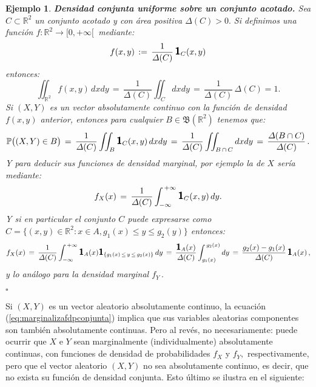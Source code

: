 \documentclass[spanish,10pt,letterpaper]{article}
\newtheorem{ejem}{Ejemplo}
\newcommand{\prob}{\mathbb{P}}
\newcommand{\Runo}{\mathbb{R}}
\newcommand{\indic}{\textbf{\textsf{\large{1}}}}
\newcommand{\qed}{\begin{flushright}$\square$\end{flushright}}
\begin{document}
\bigskip 

\begin{ejem}\label{ej:unifbiv}
    \textbf{Densidad conjunta uniforme sobre un conjunto acotado.} Sea $C\subset\Runo^2$ un conjunto acotado y con área positiva $\varDelta(C)>0.$ Si definimos una función $f:\Runo^2\rightarrow[0,+\infty[\,$ mediante:
    $$f(x,y) \,:=\, \frac{1}{\varDelta(C)}\,\indic_C(x,y)$$
    entonces:
    $$\iint_{\Runo^2}f(x,y)\,dxdy \,=\, \frac{1}{\varDelta(C)}\iint_C dxdy \,=\, \frac{1}{\varDelta(C)}\,\varDelta(C)=1.$$ Si $(X,Y)$ es un vector absolutamente continuo con la función de densidad $f(x,y)$ anterior, entonces para cualquier $B\in\mathfrak{B}(\Runo^2)$ tenemos que:
    $$\prob\big((X,Y)\in B\big) \,=\, \frac{1}{\varDelta(C)}\iint_B\indic_C(x,y)\,dxdy \,=\, \frac{1}{\varDelta(C)}\iint_{B\,\cap\,C}dxdy \,=\, \frac{\varDelta(B\cap C)}{\varDelta(C)}\,.$$
    Y para deducir sus funciones de densidad marginal, por ejemplo la de $X$ sería mediante:
    $$f_X(x) \,=\, \frac{1}{\varDelta(C)}\int_{-\infty}^{\,+\infty}\indic_C(x,y)\,dy.$$
    Y si en particular el conjunto $C$ puede expresarse como $C=\{(x,y)\in\Runo^2:x\in A, g_1(x) \leq y \leq g_2(y)\}$ entonces:
    $$f_X(x) \,=\, \frac{1}{\varDelta(C)}\int_{-\infty}^{\,+\infty}\indic_A(x)\indic_{\{g_1(x)\,\leq\,y\,\leq\,g_2(x)\}}\,dy \,=\, \frac{\indic_A(x)}{\varDelta(C)}\int_{g_1(x)}^{\,g_2(x)}dy \,=\, \frac{g_2(x)-g_1(x)}{\varDelta(C)}\,\indic_A(x)\,,$$
    y lo análogo para la densidad marginal $f_Y\,.$ \qed 
\end{ejem}

Si $(X,Y)$ es un vector aleatorio absolutamente continuo, la ecuación (\ref{eq:marginalizafdpconjunta}) implica que sus variables aleatorias componentes son también absolutamente continuas. Pero al revés, no necesariamente: puede ocurrir que $X$ e $Y$ sean marginalmente (individualmente) absolutamente continuas, con funciones de densidad de probabilidades $f_X$ y $f_Y,$ respectivamente, pero que el vector aleatorio $(X,Y)$ no sea absolutamente continuo, es decir, que no exista su función de densidad conjunta. Esto último se ilustra en el siguiente:

\bigskip 
\end{document}
